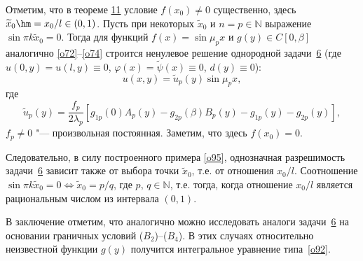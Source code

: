 \smallskip

Отметим, что в теореме \hyperlink{sab:th11}{11} условие  $f(x_0)\neq0$ существенно, здесь $\widetilde{x}_0\hm =x_0/l\in(0,1)$. 
Пусть при некоторых $\widetilde{x}_0$ и $n=p\in\mathbb{N}$ выражение ${\sin\pi k\widetilde{x}_0=0}$. 
Тогда для функций $f(x)=\sin\mu_px$ и $g(y)\in C[0,\beta]$ аналогично \eqref{o72}--\eqref{o74} строится ненулевое решение однородной задачи~\hyperlink{sab:task6}{6}  (где $u(0,y)=u(l,y)\equiv0$, $\varphi(x)=\widetilde{\psi}(x)\equiv0$, $d(y)\equiv0$):
\begin{equation}
\label{o95}
u(x,y)=\widetilde{u}_p(y)\sin\mu_px,
\end{equation}
где
$$
\widetilde{u}_p(y)=\frac{f_p}{2\lambda_p}\left[g_{1p}(0)A_p(y)-g_{2p}(\beta)B_p(y)-g_{1p}(y)-g_{2p}(y)\right],
$$
$f_p\neq0$ "--- произвольная постоянная. Заметим, что здесь $f(x_0)=0$.

Следовательно, в силу построенного примера \eqref{o95},   однозначная разрешимость задачи~\hyperlink{sab:task6}{6}   зависит также от выбора точки $\widetilde{x}_0$, т.е. от отношения $x_0/l$. Соотношение $\sin\pi k\widetilde{x}_0=0 \Leftrightarrow \widetilde{x}_0=p/q$, где $p,\,q\in\mathbb{N}$, т.е. тогда, когда отношение $x_0/l$ является рациональным числом из интервала $(0,1)$.

В заключение отметим, что аналогично можно исследовать аналоги задачи~\hyperlink{sab:task6}{6}  на основании граничных условий (\hyperlink{B_2}{$B_2$})--(\hyperlink{B_4}{$B_4$}). В этих случаях относительно неизвестной функции $g(y)$ получится интегральное уравнение типа~\eqref{o92}.

\bigskip








